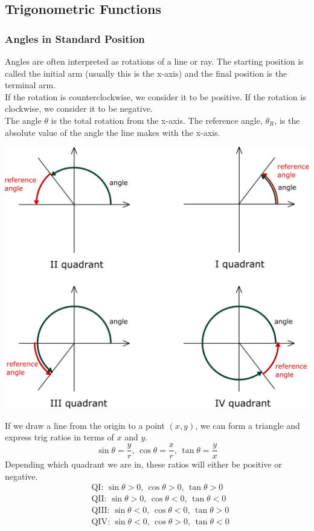 \subsection{Trigonometric Functions}

\subsubsection{Angles in Standard Position}
Angles are often interpreted as rotations of a line or ray. The starting position is called the initial arm (usually this is the x-axis) and the final position is the terminal arm.\\
If the rotation is counterclockwise, we consider it to be positive. If the rotation is clockwise, we consider it to be negative.\\
The angle $\theta$ is the total rotation from the x-axis. The reference angle, $\theta_R$, is the absolute value of the angle the line makes with the x-axis.\\
\centerline{\includegraphics[scale=0.13]{Images/PreCalcPictures/ReferenceAngle.png}}
If we draw a line from the origin to a point $(x,y)$, we can form a triangle and express trig ratios in terms of $x$ and $y$.
$$\sin\theta=\frac{y}{r},\,\cos\theta=\frac{x}{r},\,\tan\theta=\frac{y}{x}$$
Depending which quadrant we are in, these ratios will either be positive or negative.
\begin{align*}
    &\mathrm{QI:}\,\sin\theta>0,\,\cos\theta>0,\,\tan\theta>0\\
    &\mathrm{QII:}\,\sin\theta>0,\,\cos\theta<0,\,\tan\theta<0\\
    &\mathrm{QIII:}\,\sin\theta<0,\,\cos\theta<0,\,\tan\theta>0\\
    &\mathrm{QIV:}\,\sin\theta<0,\,\cos\theta>0,\,\tan\theta<0
\end{align*}

